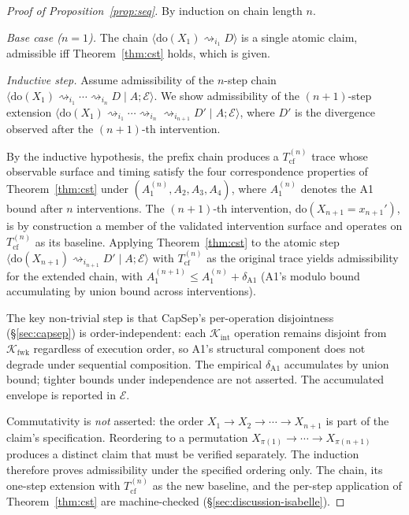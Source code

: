 \documentclass[conference]{IEEEtran}
\newcommand{\Tcf}{T_\text{cf}}
\newcommand{\Kint}{\mathcal{K}_\text{int}}
\newcommand{\Kfwk}{\mathcal{K}_\text{fwk}}
\begin{document}
\begin{proof}[Proof of Proposition~\ref{prop:seq}]
By induction on chain length $n$.

\emph{Base case ($n{=}1$).} The chain
$\langle \text{do}(X_1) \rightsquigarrow_{i_1} D \rangle$ is a
single atomic claim, admissible iff Theorem~\ref{thm:cst} holds,
which is given.

\emph{Inductive step.} Assume admissibility of the
$n$-step chain
$\langle \text{do}(X_1) \rightsquigarrow_{i_1} \cdots
\rightsquigarrow_{i_n} D \mid A; \mathcal{E}\rangle$. We show
admissibility of the $(n{+}1)$-step extension
$\langle \text{do}(X_1) \rightsquigarrow_{i_1} \cdots
\rightsquigarrow_{i_n} \rightsquigarrow_{i_{n+1}} D' \mid A;
\mathcal{E}\rangle$, where $D'$ is the divergence observed after
the $(n{+}1)$-th intervention.

By the inductive hypothesis, the prefix chain produces a
$\Tcf^{(n)}$ trace whose observable surface and timing satisfy
the four correspondence properties of Theorem~\ref{thm:cst} under
$(A_1^{(n)}, A_2, A_3, A_4)$, where $A_1^{(n)}$ denotes the A1
bound after $n$ interventions. The $(n{+}1)$-th intervention,
$\text{do}(X_{n+1} = x_{n+1}')$, is by construction a member of the
validated intervention surface and operates on
$\Tcf^{(n)}$ as its baseline. Applying Theorem~\ref{thm:cst} to
the atomic step $\langle \text{do}(X_{n+1}) \rightsquigarrow_{i_{n+1}}
D' \mid A; \mathcal{E}\rangle$ with $\Tcf^{(n)}$ as the original
trace yields admissibility for the extended chain, with
$A_1^{(n+1)} \leq A_1^{(n)} + \delta_{\text{A1}}$ (A1's modulo
bound accumulating by union bound across interventions).

The key non-trivial step is that CapSep's per-operation
disjointness (\S\ref{sec:capsep}) is order-independent: each
$\Kint$ operation remains disjoint from $\Kfwk$ regardless of
execution order, so A1's structural component does not degrade
under sequential composition. The empirical $\delta_{\text{A1}}$
accumulates by union bound; tighter bounds under independence
are not asserted. The accumulated envelope is reported in
$\mathcal{E}$.

Commutativity is \emph{not} asserted: the order
$X_1 \to X_2 \to \cdots \to X_{n+1}$ is part of the claim's
specification. Reordering to a permutation $X_{\pi(1)} \to \cdots
\to X_{\pi(n+1)}$ produces a distinct claim that must be verified
separately. The induction therefore proves admissibility under
the specified ordering only. The chain, its one-step extension
with $\Tcf^{(n)}$ as the new baseline, and the per-step application
of Theorem~\ref{thm:cst} are machine-checked
(\S\ref{sec:discussion-isabelle}).
\end{proof}
\end{document}
